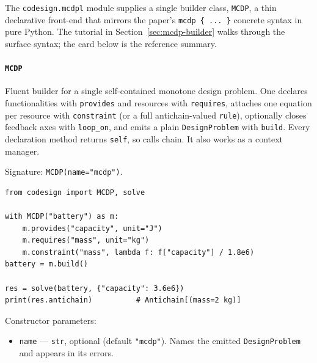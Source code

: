\documentclass[11pt,a4paper]{article}
\begin{document}
The \texttt{codesign.mcdpl} module supplies a single builder class,
\texttt{MCDP}, a thin declarative front-end that mirrors the paper's
\texttt{mcdp \{ ... \}} concrete syntax in pure Python. The tutorial in
Section~\ref{sec:mcdp-builder} walks through the surface syntax; the card
below is the reference summary.

\paragraph{\texttt{MCDP}}\label{ref:mcdpl:mcdp}
Fluent builder for a single self-contained monotone design problem. One
declares functionalities with \texttt{provides} and resources with
\texttt{requires}, attaches one equation per resource with
\texttt{constraint} (or a full antichain-valued \texttt{rule}), optionally
closes feedback axes with \texttt{loop\_on}, and emits a plain
\texttt{DesignProblem} with \texttt{build}. Every declaration method
returns \texttt{self}, so calls chain. It also works as a context manager.

Signature: \texttt{MCDP(name="mcdp")}.

\begin{lstlisting}
from codesign import MCDP, solve

with MCDP("battery") as m:
    m.provides("capacity", unit="J")
    m.requires("mass", unit="kg")
    m.constraint("mass", lambda f: f["capacity"] / 1.8e6)
battery = m.build()

res = solve(battery, {"capacity": 3.6e6})
print(res.antichain)          # Antichain[(mass=2 kg)]
\end{lstlisting}

Constructor parameters:
\begin{itemize}[nosep]
  \item \texttt{name} --- \texttt{str}, optional (default \texttt{"mcdp"}).
        Names the emitted \texttt{DesignProblem} and appears in its errors.
\end{itemize}
\end{document}
